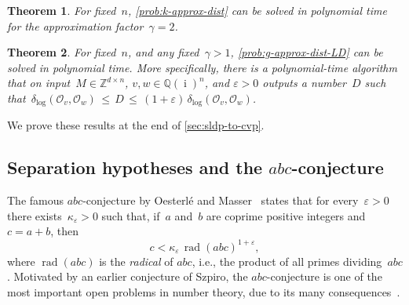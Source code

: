 \documentclass[10pt,a4paper]{article}
\newtheorem{theorem}{Theorem}[section]
\theoremstyle{definition}
\DeclareMathOperator{\rad}{rad}
\DeclareMathOperator{\ii}{i}
\newcommand{\distLD}{\delta_{\log}}
\newcommand{\QQ}{\mathbb{Q}}
\newcommand{\ZZ}{\mathbb{Z}}
\newcommand{\OO}{\ensuremath{\mathcal{O}}}
\newcommand{\eps}{\varepsilon}
\newcommand{\abc}{\texorpdfstring{$abc$}{abc}}
\numberwithin{equation}{section}
\begin{document}
\begin{theorem}\label{thm:compact-fixed-dimension}
For fixed~$n$, \cref{prob:k-approx-dist} can be solved in polynomial time
for the approximation factor~$\gamma = 2$.
\end{theorem}

\begin{theorem}\label{thm:fixed-dimension}
For fixed~$n$,
and any fixed~$\gamma>1$,
\cref{prob:g-approx-dist-LD} can be solved in polynomial time.
More specifically, there is a polynomial-time algorithm that on
input~$M\in\ZZ^{d\times n}$, $v,w \in \QQ(\ii)^n$, and $\eps>0$ outputs a number~$D$
such that~$\distLD(\OO_v,\OO_w) \,\leq \, D \, \leq\, (1+\varepsilon)\, \distLD(\OO_v,\OO_w)$.
\end{theorem}

We prove these results at the end of \cref{sec:sldp-to-cvp}.

\subsection{Separation hypotheses and the \abc-conjecture}\label{subsec:intro-abc}
The famous \abc-conjecture by Oesterl\'{e} and Masser~\cite{oesterle} states that for every~$\varepsilon>0$
there exists~$\kappa_\varepsilon>0$ such that, if~$a$ and~$b$ are coprime positive integers and $c=a+b$, then
\[
c < \kappa_\varepsilon \, \rad(abc)^{1+\varepsilon},
\] where $\rad(abc)$ is the \textit{radical} of $abc$, i.e., the product of all primes dividing~$abc$.
Motivated by an earlier conjecture of Szpiro, the \abc-conjecture is one of the most important open problems
in number theory,
due to its many consequences~\cite{granvilletucker,abc-consequences}.
\end{document}
